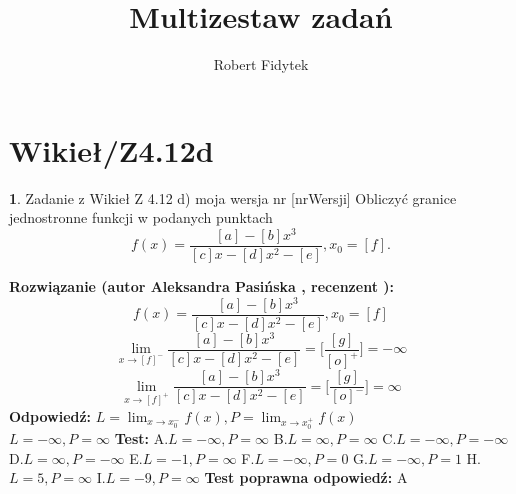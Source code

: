 \documentclass[12pt, a4paper]{article}
\title{Multizestaw zadań}
\author{Robert Fidytek}
\date{}
\theoremstyle{definition} %
\newtheorem{zad}{}
\newcommand{\kategoria}[1]{\section{#1}} %
\newcommand{\zadStart}[1]{\begin{zad}#1\newline} %
\newcommand{\zadStop}{\end{zad}}   %
\newcommand{\rozwStart}[2]{\noindent \textbf{Rozwiązanie (autor #1 , recenzent #2): }\newline} %
\newcommand{\rozwStop}{\newline}                                            %
\newcommand{\odpStart}{\noindent \textbf{Odpowiedź:}\newline}    %
\newcommand{\odpStop}{\newline}                                             %
\newcommand{\testStart}{\noindent \textbf{Test:}\newline} %
\newcommand{\testStop}{\newline} %
\newcommand{\kluczStart}{\noindent \textbf{Test poprawna odpowiedź:}\newline} %
\newcommand{\kluczStop}{\newline} %
\begin{document}
\maketitle


\kategoria{Wikieł/Z4.12d}
\zadStart{Zadanie z Wikieł Z 4.12 d) moja wersja nr [nrWersji]}
Obliczyć granice jednostronne funkcji w podanych punktach $$f(x)=\frac{[a]-[b]x^3}{[c]x-[d]x^2-[e]},x_{0}=[f].$$
\zadStop
\rozwStart{Aleksandra Pasińska}{}
$$f(x)=\frac{[a]-[b]x^3}{[c]x-[d]x^2-[e]},x_{0}=[f]$$
$$\lim_{x\rightarrow [f]^-}\frac{[a]-[b]x^3}{[c]x-[d]x^2-[e]}=\biggl[\frac{[g]}{[o]^+}\biggr]=-\infty$$ 
$$\lim_{x\rightarrow [f]^+}\frac{[a]-[b]x^3}{[c]x-[d]x^2-[e]}=\biggl[\frac{[g]}{[o]^-}\biggr]=\infty$$ 
\rozwStop
\odpStart
$L=\lim_{x\rightarrow x_{0}^-}f(x),P=\lim_{x\rightarrow x_{0}^+}f(x)$\\
$L=-\infty, P=\infty$
\odpStop
\testStart
A.$L=-\infty, P=\infty $
B.$L=\infty, P=\infty$
C.$L=-\infty, P=-\infty$
D.$L=\infty, P=-\infty$
E.$L=-1, P=\infty$
F.$L=-\infty, P=0$
G.$L=-\infty, P=1$
H.$L=5, P=\infty$
I.$L=-9, P=\infty$
\testStop
\kluczStart
A
\kluczStop
\end{document}
